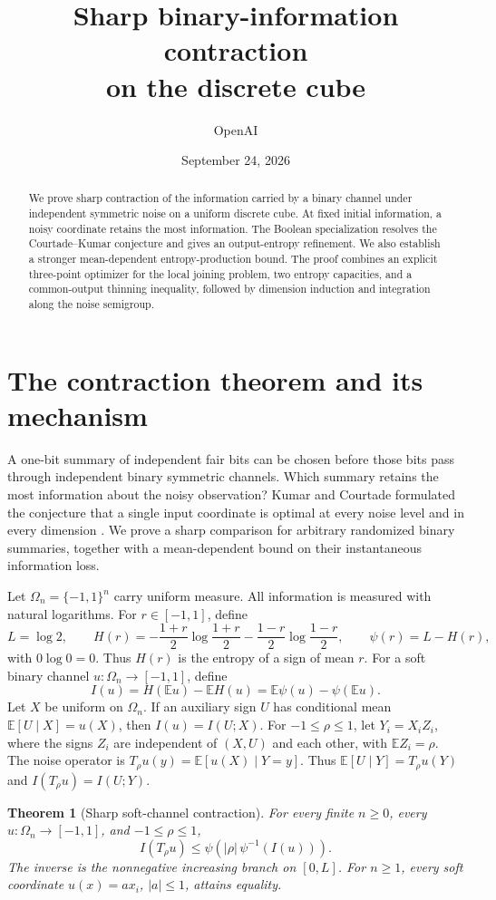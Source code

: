 \documentclass[11pt]{article}
\title{Sharp binary-information contraction\\on the discrete cube}
\author{OpenAI}
\date{September 24, 2026}
\newtheorem{theorem}{Theorem}[section]
\theoremstyle{definition}
\theoremstyle{remark}
\newcommand{\E}{\mathbb E}
\numberwithin{equation}{section}
\begin{document}
\maketitle
\begin{abstract}
We prove sharp contraction of the information carried by a binary channel
under independent symmetric noise on a uniform discrete cube. At fixed
initial information, a noisy coordinate retains the most information.
The Boolean specialization resolves the Courtade--Kumar conjecture and
gives an output-entropy refinement. We also establish a stronger
mean-dependent entropy-production bound. The proof combines an explicit
three-point optimizer for the local joining problem, two entropy
capacities, and a common-output thinning inequality, followed by dimension
induction and integration along the noise semigroup.
\end{abstract}

\section{The contraction theorem and its mechanism}
\label{main:section}

A one-bit summary of independent fair bits can be chosen before those
bits pass through independent binary symmetric channels. Which summary
retains the most information about the noisy observation? Kumar and
Courtade formulated the conjecture that a single input coordinate is
optimal at every noise level and in every dimension
\cite{KumarCourtade2013,CourtadeKumar2014}. We prove a sharp comparison
for arbitrary randomized binary summaries, together with a
mean-dependent bound on their instantaneous information loss.

Let $\Omega_n=\{-1,1\}^n$ carry uniform measure. All information
is measured with natural logarithms. For $r\in[-1,1]$, define
\[
 L=\log2,\qquad
 H(r)=-\frac{1+r}{2}\log\frac{1+r}{2}
      -\frac{1-r}{2}\log\frac{1-r}{2},\qquad \psi(r)=L-H(r),
\]
with $0\log0=0$. Thus $H(r)$ is the entropy of a sign of mean $r$.
For a soft binary channel $u:\Omega_n\to[-1,1]$, define
\[
 I(u)=H(\E u)-\E H(u)=\E\psi(u)-\psi(\E u).
\]
Let $X$ be uniform on $\Omega_n$. If an auxiliary sign $U$ has conditional mean
$\E[U\mid X]=u(X)$, then $I(u)=I(U;X)$.  For
$-1\le\rho\le1$, let $Y_i=X_iZ_i$, where the signs $Z_i$
are independent of $(X,U)$ and each other, with $\E Z_i=\rho$.
The noise operator is $T_\rho u(y)=\E[u(X)\mid Y=y]$.
Thus $\E[U\mid Y]=T_\rho u(Y)$ and $I(T_\rho u)=I(U;Y)$.

\begin{theorem}[Sharp soft-channel contraction]
\label{main:soft}
For every finite $n\ge0$, every $u:\Omega_n\to[-1,1]$, and
$-1\le\rho\le1$,
\begin{equation}
 I(T_\rho u)
 \le\psi\!\left(|\rho|\,\psi^{-1}(I(u))\right).
 \label{main:interpolation}
\end{equation}
The inverse is the nonnegative increasing branch on $[0,L]$.
For $n\ge1$, every soft coordinate $u(x)=a x_i$, $|a|\le1$,
attains equality.
\end{theorem}
\end{document}
